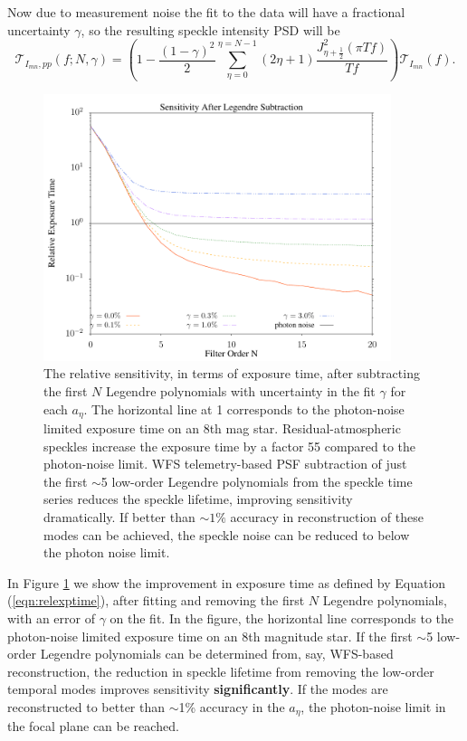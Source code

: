 \documentclass[10pt,preprint]{aastex631}
\begin{document}
Now due to measurement noise the fit to the data will have a fractional uncertainty $\gamma$, so the resulting speckle intensity PSD will be
\begin{equation}
\mathcal{T}_{I_{mn},pp}(f;N,\gamma) = \left( 1 -  \frac{(1-\gamma)^2}{2}\sum_{\eta=0}^{\eta=N-1}  (2\eta+1) \frac{J_{\eta+\frac{1}{2}}^2(\pi T f)}{T f}\right) \mathcal{T}_{I_{mn}}(f).
\end{equation}

\begin{figure}
\centering
\includegraphics[width=4in]{relsens.pdf}
\caption{The relative sensitivity, in terms of exposure time, after subtracting the first $N$ Legendre polynomials with uncertainty in the fit $\gamma$ for each $a_\eta$.  The horizontal line at 1 corresponds to the photon-noise limited exposure time on an 8th mag star.  Residual-atmospheric speckles increase the exposure time by a factor 55 compared to the photon-noise limit.   
WFS telemetry-based PSF subtraction of just the first $\sim$5 low-order Legendre polynomials from the speckle time series reduces the speckle lifetime, improving sensitivity dramatically. If better than $\sim$$1\%$ accuracy in reconstruction of these modes can be achieved, the speckle noise can be reduced to below the photon noise limit. \label{fig:legrelsens}}
\end{figure}

In Figure \ref{fig:legrelsens} we show the improvement in exposure time as defined by Equation (\ref{eqn:relexptime}), after fitting and removing the first $N$ Legendre polynomials, with an error of $\gamma$ on the fit.  In the figure, the horizontal line corresponds to the photon-noise limited exposure time on an 8th magnitude star.  If the first $\sim$5 low-order Legendre polynomials can be determined from, say, WFS-based reconstruction, the reduction in speckle lifetime from removing the low-order temporal modes improves sensitivity \textbf{significantly}.  If the modes are reconstructed to better than $\sim$1\% accuracy in the $a_\eta$, the photon-noise limit in the focal plane can be reached.
\end{document}
